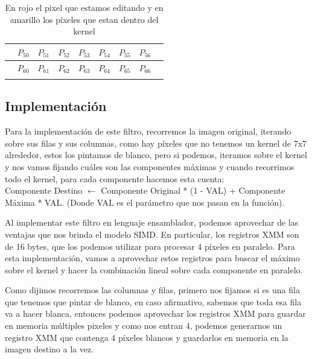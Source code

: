 \begin{table}[h]
\begin{tabular}{l|c|c|c|c|c|c|c|l}
 & \cellcolor[HTML]{FAFE8E}$P_{50}$ & \cellcolor[HTML]{FAFE8E}$P_{51}$  & \cellcolor[HTML]{FAFE8E}$P_{52}$  & \cellcolor[HTML]{FAFE8E}$P_{53}$  & \cellcolor[HTML]{FAFE8E}$P_{54}$  & \cellcolor[HTML]{FAFE8E}$P_{55}$ & \cellcolor[HTML]{FAFE8E}$P_{56}$ &  \\ \hline
 & \cellcolor[HTML]{FAFE8E}$P_{60}$ & \cellcolor[HTML]{FAFE8E}$P_{61}$  & \cellcolor[HTML]{FAFE8E}$P_{62}$  & \cellcolor[HTML]{FAFE8E}$P_{63}$  & \cellcolor[HTML]{FAFE8E}$P_{64}$  & \cellcolor[HTML]{FAFE8E}$P_{65}$ & \cellcolor[HTML]{FAFE8E}$P_{66}$ &  \\ \hline
 & \multicolumn{1}{l|}{}      & \multicolumn{1}{l|}{}      & \multicolumn{1}{l|}{}       & \multicolumn{1}{l|}{}       & \multicolumn{1}{l|}{}       & \multicolumn{1}{l|}{}       & \multicolumn{1}{l|}{}      &
\end{tabular}
\caption{En rojo el pixel que estamos editando y en amarillo los píxeles que estan dentro del kernel}
\end{table}


\subsection{Implementación}

Para la implementación de este filtro, recorremos la imagen original, iterando sobre sus filas y sus columnas, como hay píxeles que no tenemos un kernel de 7x7 alrededor, estos los pintamos de blanco, pero si podemos, iteramos sobre el kernel y nos vamos fijando cuáles son las componentes máximas y cuando recorrimos todo el kernel, para cada componente hacemos esta cuenta: \\ Componente Destino $\leftarrow$ Componente Original * (1 - VAL) + Componente Máxima * VAL. (Donde VAL es el parámetro que nos pasan en la función).

Al implementar este filtro en lenguaje ensamblador, podemos aprovechar de las ventajas que nos brinda el modelo SIMD. En particular, los registros XMM son de 16 bytes, que los podemos utilizar para procesar 4 píxeles en paralelo. Para esta implementación, vamos a aprovechar estos registros para buscar el máximo sobre el kernel y hacer la combinación lineal sobre cada componente en paralelo.

Como dijimos recorremos las columnas y filas, primero nos fijamos si es una fila que tenemos que pintar de blanco, en caso afirmativo, sabemos que toda esa fila va a hacer blanca, entonces podemos aprovechar los registros XMM para guardar en memoria múltiples pixeles y como nos entran 4, podemos generarnos un registro XMM que contenga 4 píxeles blancos y guardarlos en memoria en la imagen destino a la vez. 

